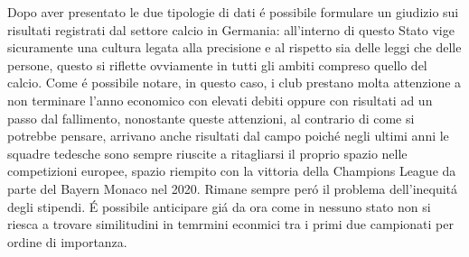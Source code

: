 \documentclass[
    corpo=12pt,
    oneside,
    evenboxes,
    tipotesi=triennale,
    stile=classica,
    oldstyle,
    autoretitolo,
    greek,
]{toptesi}
\begin{document}
\begin{interlinea}{1.5}
Dopo aver presentato le due tipologie di dati \'e possibile formulare un giudizio sui risultati registrati dal settore calcio in Germania: all'interno
di questo Stato vige sicuramente una cultura legata alla precisione e al rispetto sia delle leggi che delle persone, questo si riflette 
ovviamente in tutti gli ambiti compreso quello del calcio. Come \'e possibile notare, in questo caso, i club prestano molta attenzione a non 
terminare l'anno economico con elevati debiti oppure con risultati ad un passo dal fallimento, nonostante queste attenzioni, al contrario
di come si potrebbe pensare, arrivano anche risultati dal campo poich\'e negli ultimi anni le squadre tedesche sono sempre riuscite a ritagliarsi 
il proprio spazio nelle competizioni europee, spazio riempito con la vittoria della Champions League da parte del Bayern Monaco nel 2020. 
Rimane sempre per\'o il problema dell'inequit\'a degli stipendi. \'E possibile anticipare gi\'a da ora come in nessuno stato non si riesca
a trovare similitudini in temrmini econmici tra i primi due campionati per ordine di importanza.


\end{interlinea}
\end{document}
